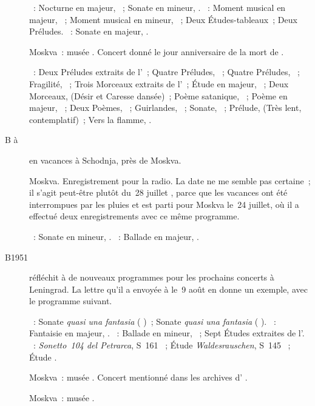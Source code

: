 \begin{description}
 \textsc{\Chopin{}}~: Nocturne en \kD \Flat majeur,  ~;
 Sonate en \kB mineur, .
 \textsc{\Rachmaninov{}}~: Moment musical en \kD \Flat majeur, 
 ~; Moment musical en \kE \Flat mineur,  ~;
 Deux Études-tableaux~; Deux Préludes.
 \textsc{\Scriabine{}}~: Sonate en \kF \Sharp majeur, .
 \item[\DateWithWeekDay{1951-04-27}]
 Moskva~: musée \Scriabine{}.
 Concert donné le jour anniversaire de la mort de \Scriabine{}.

 \textsc{\Scriabine{}}~: Deux Préludes extraits de l'~; Quatre
 Préludes, ~; Quatre Préludes, ~; Fragilité, 
 ~; Trois Morceaux extraits de l'~; Étude en \kE \Flat
 majeur,  ~; Deux Morceaux,  (Désir et Caresse
 dansée)~; Poème satanique, ~; Poème en \kC majeur, 
 ~; Deux Poèmes, ~; Guirlandes,  ~;
 Sonate, ~; Prélude,   (Très lent,
 contemplatif)~; Vers la flamme, .
 \item[B\DateWithWeekDay{1951-07-18} à \DateWithWeekDay{1951-08-14}]
 \VSofronitsky{} en vacances à Schodnja, près de Moskva.
 \item[\DateWithWeekDay{1951-08-28}]
 Moskva.
 Enregistrement pour la radio.
 La date ne me semble pas certaine~; il s'agit peut-être plutôt du~28
 juillet \citep[voir][p.~171]{Nekrasova08}, parce que les vacances ont été
 interrompues par les pluies et \Sofronitsky{} est parti pour Moskva le~24
 juillet, où il a effectué deux enregistrements avec ce même programme.

 \textsc{\Beethoven{}}~: Sonate en \kC mineur, .
 \textsc{\Chopin{}}~: Ballade en \kA \Flat majeur, .
 \item[B1951]
 \VSofronitsky{} réfléchit à de nouveaux programmes pour les prochains
 concerts à Leningrad.
 La lettre qu'il a envoyée à \AVizel{} le~9 août \citep[p.~171]{Nekrasova08}
 en donne un exemple, avec le programme suivant.

 \textsc{\Beethoven{}}~: Sonate \emph{quasi una fantasia} 
 ( )~; Sonate \emph{quasi una fantasia} 
 ( ).
 \textsc{\Schumann{}}~: Fantaisie en \kC majeur, .
 \textsc{\Chopin{}}~: Ballade  en \kF mineur, ~; Sept
 Études extraites de l'.
 \textsc{\Liszt{}}~: \emph{Sonetto~104 del Petrarca}, S~161 ~;
 Étude \emph{Waldesrauschen}, S~145 ~; Étude .
 \item[\DateWithWeekDay{1951-09-22}]
 Moskva~: musée \Scriabine{}.
 Concert mentionné dans les archives d'\AVizel{}
 \citep[voir][p.~171]{Nekrasova08}.
 \item[\DateWithWeekDay{1951-10-20}]
 Moskva~: musée \Scriabine{}.


\end{description}
